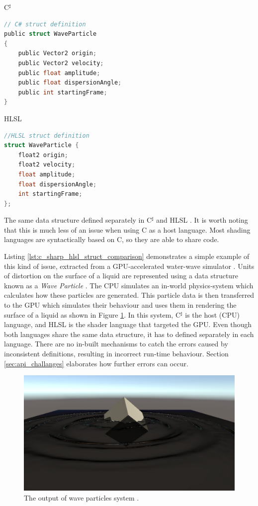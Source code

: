 \documentclass[a4paper,12pt,twoside,openright]{report}
\begin{document}
\begin{lstfloat}
\begin{center} C$^\sharp$ \end{center}
\begin{lstlisting}[language=C]
// C# struct definition
public struct WaveParticle
{
    public Vector2 origin;
    public Vector2 velocity;
    public float amplitude;
    public float dispersionAngle;
    public int startingFrame;
}
\end{lstlisting}
\begin{center} HLSL \end{center}
\begin{lstlisting}[language=C]
//HLSL struct definition
struct WaveParticle {
    float2 origin;
    float2 velocity;
    float amplitude;
    float dispersionAngle;
    int startingFrame;
};
\end{lstlisting}
\caption{The same data structure defined separately in C$^\sharp$ and HLSL
\cite{WaveParticlesGPU}. It is worth noting that this is much less of an issue
when using C as a host language. Most shading languages are
syntactically based on C, so they are able to share code.}
\label{lst:c_sharp_hlsl_struct_comparison}
\end{lstfloat}

Listing \ref{lst:c_sharp_hlsl_struct_comparison} demonstrates a simple example
of this kind of issue, extracted from a GPU-accelerated water-wave simulator
\cite{WaveParticlesGPU}. Units of distortion on the surface of a liquid are
represented using a data structure known as a \textit{Wave Particle}
\cite{WaveParticlesOriginalPaper}. The CPU simulates an in-world physics-system
which calculates how these particles are generated. This particle data is then
transferred to the GPU which simulates their behaviour and uses them in
rendering the surface of a liquid as shown in Figure
\ref{fig:waveparticles_example}. In this system, C$^\sharp$ is the host (CPU)
language, and HLSL is the shader language that targeted the GPU. Even though
both languages share the same data structure, it has to defined separately in
each language. There are no in-built mechanisms to catch the errors caused by
inconsistent definitions, resulting in incorrect run-time behaviour. Section
\ref{sec:api_challanges} elaborates how further errors can occur.

\begin{figure}[h]
\centering
\includegraphics[width=0.8\linewidth]{waveparticles_example}
\caption{The output of wave particles system \cite{WaveParticlesGPU}.}
\label{fig:waveparticles_example}
\end{figure}
\end{document}
